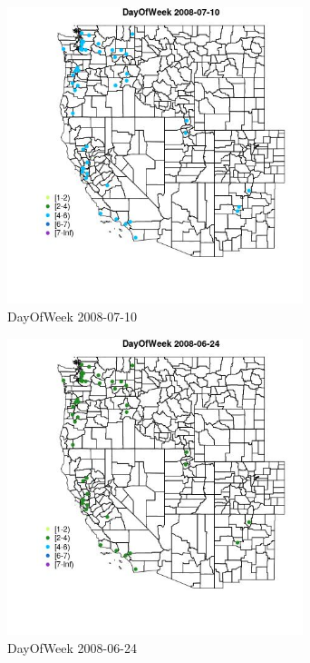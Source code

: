 \begin{figure} 
\centering  
\includegraphics[width=0.77\textwidth]{Code_Outputs/Report_ML_input_PM25_Step4_part_e_de_duplicated_aves_MapObsDayOfWeek2008-07-10.jpg} 
\caption{\label{fig:Report_ML_input_PM25_Step4_part_e_de_duplicated_avesMapObsDayOfWeek2008-07-10}DayOfWeek 2008-07-10} 
\end{figure} 
 

\begin{figure} 
\centering  
\includegraphics[width=0.77\textwidth]{Code_Outputs/Report_ML_input_PM25_Step4_part_e_de_duplicated_aves_MapObsDayOfWeek2008-06-24.jpg} 
\caption{\label{fig:Report_ML_input_PM25_Step4_part_e_de_duplicated_avesMapObsDayOfWeek2008-06-24}DayOfWeek 2008-06-24} 
\end{figure} 
 

